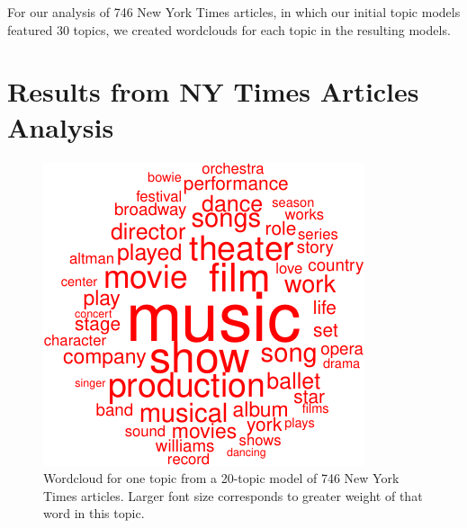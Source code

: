 \documentclass[12pt,]{article}
\begin{document}
For our analysis of 746 New York Times articles, in which our initial
topic models featured 30 topics, we created wordclouds for each topic in
the resulting models.

\section{Results from NY Times Articles
Analysis}\label{results-from-ny-times-articles-analysis}

\begin{figure}
\includegraphics[width=\textwidth]{lda-tutorial-2016_files/figure-latex/wordcloud1-1.pdf}
\caption{Wordcloud for one topic from a 20-topic model of 746 New York Times articles. Larger font size corresponds to greater weight of that word in this topic.\label{fig:wc1}}
\end{figure}
\end{document}
